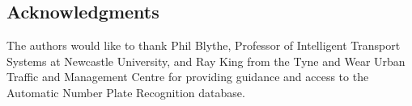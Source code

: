 \vspace{-0.3cm}
\subsection*{Acknowledgments}

The authors would like to thank Phil Blythe, Professor of Intelligent Transport Systems at Newcastle University, and Ray King from the Tyne and Wear Urban Traffic and Management Centre for providing guidance and access to the Automatic Number Plate Recognition database.
